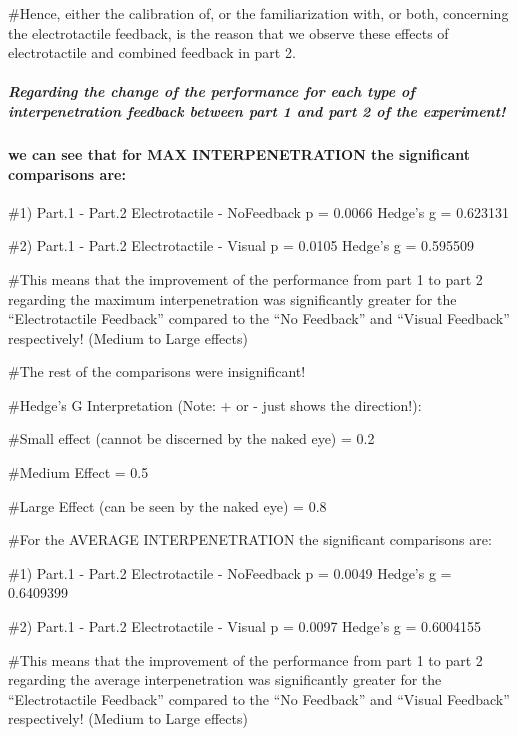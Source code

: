 \documentclass[
]{article}
\begin{document}
\#Hence, either the calibration of, or the familiarization with, or
both, concerning the electrotactile feedback, is the reason that we
observe these effects of electrotactile and combined feedback in part 2.

\hypertarget{regarding-the-change-of-the-performance-for-each-type-of-interpenetration-feedback-between-part-1-and-part-2-of-the-experiment}{%
\subparagraph{Regarding the change of the performance for each type of
interpenetration feedback between part 1 and part 2 of the
experiment!}\label{regarding-the-change-of-the-performance-for-each-type-of-interpenetration-feedback-between-part-1-and-part-2-of-the-experiment}}

\hypertarget{we-can-see-that-for-max-interpenetration-the-significant-comparisons-are}{%
\paragraph{we can see that for MAX INTERPENETRATION the significant
comparisons
are:}\label{we-can-see-that-for-max-interpenetration-the-significant-comparisons-are}}

\#1) Part.1 - Part.2 Electrotactile - NoFeedback p = 0.0066 Hedge's g =
0.623131

\#2) Part.1 - Part.2 Electrotactile - Visual p = 0.0105 Hedge's g =
0.595509

\#This means that the improvement of the performance from part 1 to part
2 regarding the maximum interpenetration was significantly greater for
the ``Electrotactile Feedback'' compared to the ``No Feedback'' and
``Visual Feedback'' respectively! (Medium to Large effects)

\#The rest of the comparisons were insignificant!

\#Hedge's G Interpretation (Note: + or - just shows the direction!):

\#Small effect (cannot be discerned by the naked eye) = 0.2

\#Medium Effect = 0.5

\#Large Effect (can be seen by the naked eye) = 0.8

\#For the AVERAGE INTERPENETRATION the significant comparisons are:

\#1) Part.1 - Part.2 Electrotactile - NoFeedback p = 0.0049 Hedge's g =
0.6409399

\#2) Part.1 - Part.2 Electrotactile - Visual p = 0.0097 Hedge's g =
0.6004155

\#This means that the improvement of the performance from part 1 to part
2 regarding the average interpenetration was significantly greater for
the ``Electrotactile Feedback'' compared to the ``No Feedback'' and
``Visual Feedback'' respectively! (Medium to Large effects)
\end{document}
